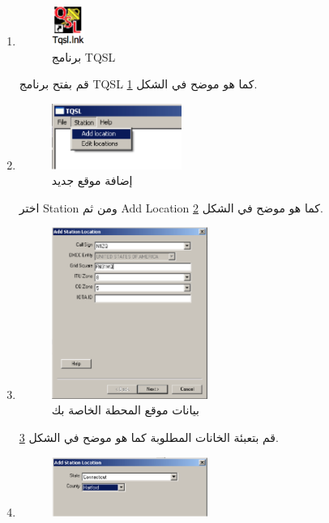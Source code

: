 \documentclass[a4paper,12pt]{article}
\begin{document}
	\begin{enumerate}
		\item
			\begin{figure}[!hbtp]
			\centering
			\includegraphics[width=0.1\textwidth]{tqsl.eps}
			\caption{برنامج TQSL}
			\label{fig:TQSL}
			\end{figure}
			  قم بفتح برنامج \textenglish{TQSL} كما هو موضح في الشكل \ref{fig:TQSL}.
\clearpage
		\item
			\begin{figure}[!hbtp]
			\centering
			\includegraphics[width=0.4\textwidth]{locationadd.eps}
			\caption{إضافة موقع جديد}
			\label{fig:LocationAdd}
			\end{figure}
			  اختر \textenglish{Station} ومن ثم \textenglish{Add Location} كما هو موضح في الشكل \ref{fig:LocationAdd}.
		\item
			\begin{figure}[!hbtp]
			\centering
			\includegraphics[width=0.48\textwidth]{locationinfo.eps}
			\caption{بيانات موقع المحطة الخاصة بك}
			\label{fig:LocationInfo}
			\end{figure}
			  قم بتعبئة الخانات المطلوبة كما هو موضح في الشكل \ref{fig:LocationInfo}.
  		\item
			\begin{figure}[!hbtp]
			\centering
			\includegraphics[width=0.48\textwidth]{locationstate.eps}

\end{figure}
\end{enumerate}
\end{document}
